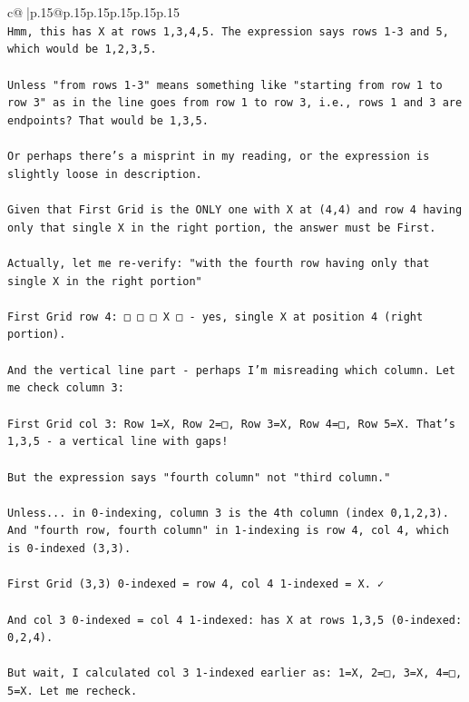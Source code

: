 \documentclass{article}
\begin{document}
{\begin{supertabular}{c@{$\;$}|p{.15\linewidth}@{}p{.15\linewidth}p{.15\linewidth}p{.15\linewidth}p{.15\linewidth}p{.15\linewidth}}
{{{\\ 
\texttt{Hmm, this has X at rows 1,3,4,5. The expression says rows 1{-}3 and 5, which would be 1,2,3,5.} \\
\\ 
\texttt{Unless "from rows 1{-}3" means something like "starting from row 1 to row 3" as in the line goes from row 1 to row 3, i.e., rows 1 and 3 are endpoints? That would be 1,3,5.} \\
\\ 
\texttt{Or perhaps there's a misprint in my reading, or the expression is slightly loose in description.} \\
\\ 
\texttt{Given that First Grid is the ONLY one with X at (4,4) and row 4 having only that single X in the right portion, the answer must be First.} \\
\\ 
\texttt{Actually, let me re{-}verify: "with the fourth row having only that single X in the right portion"} \\
\\ 
\texttt{First Grid row 4: □ □ □ X □ {-} yes, single X at position 4 (right portion).} \\
\\ 
\texttt{And the vertical line part {-} perhaps I'm misreading which column. Let me check column 3:} \\
\\ 
\texttt{First Grid col 3: Row 1=X, Row 2=□, Row 3=X, Row 4=□, Row 5=X. That's 1,3,5 {-} a vertical line with gaps!} \\
\\ 
\texttt{But the expression says "fourth column" not "third column."} \\
\\ 
\texttt{Unless... in 0{-}indexing, column 3 is the 4th column (index 0,1,2,3). And "fourth row, fourth column" in 1{-}indexing is row 4, col 4, which is 0{-}indexed (3,3).} \\
\\ 
\texttt{First Grid (3,3) 0{-}indexed = row 4, col 4 1{-}indexed = X. ✓} \\
\\ 
\texttt{And col 3 0{-}indexed = col 4 1{-}indexed: has X at rows 1,3,5 (0{-}indexed: 0,2,4).} \\
\\ 
\texttt{But wait, I calculated col 3 1{-}indexed earlier as: 1=X, 2=□, 3=X, 4=□, 5=X. Let me recheck.} \\
\\ 
}}}
\end{supertabular}}
\end{document}
